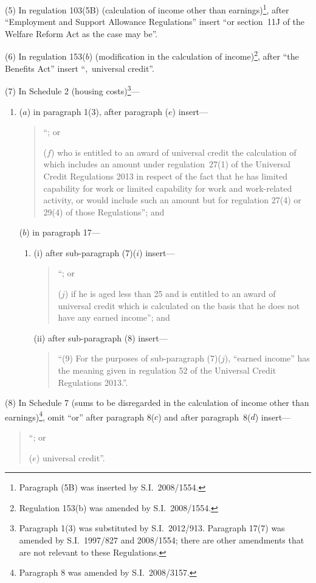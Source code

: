 \documentclass[12pt,a4paper]{article}
\begin{document}
(5) In regulation 103(5B) (calculation of income other than earnings)\footnote{Paragraph (5B) was inserted by S.I.~2008/1554.}, after “Employment and Support Allowance Regulations” insert “or section~11J of the Welfare Reform Act as the case may be”.

(6) In regulation 153($b$)  (modification in the calculation of income)\footnote{Regulation 153(b) was amended by S.I.~2008/1554.}, after “the Benefits Act” insert “,~universal credit”.

(7) In Schedule 2 (housing costs)\footnote{Paragraph 1(3) was substituted by S.I.~2012/913. Paragraph 17(7) was amended by S.I.~1997/827 and 2008/1554; there are other amendments that are not relevant to these Regulations.}—
\begin{enumerate}\item[]
($a$) in paragraph 1(3), after paragraph ($e$)  insert—
\begin{quotation}
“; or

($f$) who is entitled to an award of universal credit the calculation of which includes an amount under regulation~27(1) of the Universal Credit Regulations 2013 in respect of the fact that he has limited capability for work or limited capability for work and work-related activity, or would include such an amount but for regulation 27(4) or 29(4) of those Regulations”; and
\end{quotation}

($b$) in paragraph 17—
\begin{enumerate}\item[]
(i) after sub-paragraph (7)($i$)  insert—
\begin{quotation}
“; or

($j$) if he is aged less than 25 and is entitled to an award of universal credit which is calculated on the basis that he does not have any earned income”; and
\end{quotation}

(ii) after sub-paragraph (8) insert—
\begin{quotation}
“(9) For the purposes of sub-paragraph (7)($j$), “earned income” has the meaning given in regulation 52 of the Universal Credit Regulations 2013.”.
\end{quotation}
\end{enumerate}
\end{enumerate}

(8) In Schedule 7 (sums to be disregarded in the calculation of income other than earnings)\footnote{Paragraph 8 was amended by S.I.~2008/3157.}, omit “or” after paragraph 8($c$)  and after paragraph~8($d$)  insert—
\begin{quotation}
“; or

($e$) universal credit”.
\end{quotation}
\end{document}

